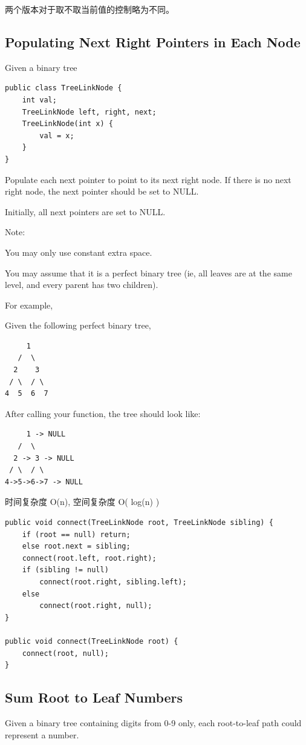 \documentclass[12pt]{book}
\begin{document}
两个版本对于取不取当前值的控制略为不同。

\subsection{Populating Next Right Pointers in Each Node}
\label{sec-4-5-5}
Given a binary tree
\lstset{language=java,label= ,caption= ,numbers=none}
\begin{lstlisting}
public class TreeLinkNode {
    int val;
    TreeLinkNode left, right, next;
    TreeLinkNode(int x) {
        val = x;
    }
}
\end{lstlisting}

Populate each next pointer to point to its next right node. If there is no next right node, the next pointer should be set to NULL.

Initially, all next pointers are set to NULL.

Note:

You may only use constant extra space.

You may assume that it is a perfect binary tree (ie, all leaves are at the same level, and every parent has two children).

For example,

Given the following perfect binary tree,
\lstset{language=java,label= ,caption= ,numbers=none}
\begin{lstlisting}
     1
   /  \
  2    3
 / \  / \
4  5  6  7
\end{lstlisting}

After calling your function, the tree should look like:
\lstset{language=java,label= ,caption= ,numbers=none}
\begin{lstlisting}
     1 -> NULL
   /  \
  2 -> 3 -> NULL
 / \  / \
4->5->6->7 -> NULL
\end{lstlisting}

时间复杂度 O(n), 空间复杂度 O( log(n) )

\lstset{language=java,label= ,caption= ,numbers=none}
\begin{lstlisting}
public void connect(TreeLinkNode root, TreeLinkNode sibling) {
    if (root == null) return;
    else root.next = sibling;
    connect(root.left, root.right);
    if (sibling != null)
        connect(root.right, sibling.left);
    else
        connect(root.right, null);
}

public void connect(TreeLinkNode root) {
    connect(root, null);
}
\end{lstlisting}

\subsection{Sum Root to Leaf Numbers}
\label{sec-4-5-6}
Given a binary tree containing digits from 0-9 only, each root-to-leaf path could represent a number.
\end{document}
